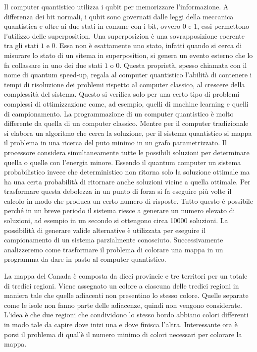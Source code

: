 Il computer quantistico utilizza i qubit per memorizzare l'informazione. A differenza dei bit normali, i qubit sono governati dalle leggi della meccanica quantistica e oltre ai due stati in comune con i bit, ovvero $0$ e $1$, essi permettono l'utilizzo delle superposition. Una superposizion è una sovrapposizione coerente tra gli stati $1$ e $0$. Essa non è esattamente uno stato, infatti quando si cerca di misurare lo stato di un sitema in superposition, si genera un evento esterno che lo fa collassare in uno dei due stati $1$ o $0$. Questa proprietà, spesso chiamata con il nome di quantum speed-up, regala al computer quantistico l'abilità di contenere i tempi di risoluzione dei problemi rispetto al computer classico, al crescere della complessità del sistema. Questo si verifica solo per una certo tipo di problemi complessi di ottimizzazione come, ad esempio, quelli di machine learning e quelli di campionamento. La programmazione di un computer quantistico è molto differente da quella di un computer classico. Mentre per il computer tradizionale si elabora un algoritmo che cerca la soluzione, per il sistema quantistico si mappa il problema in una ricerca del puto minimo in un grafo parametrizzato. Il processore considera simultaneamente tutte le possibili soluzioni per determinare quella o quelle con l'energia minore. Essendo il quantum computer un sistema probabilistico invece che deterministico non ritorna solo la soluzione ottimale ma ha una certa probabilità di ritornare anche soluzioni vicine a quella ottimale. Per trasformare questa debolezza in un punto di forza si fa eseguire più volte il calcolo in modo che produca un certo numero di risposte. Tutto questo è possibile perché in un breve periodo il sistema riesce a generare un numero elevato di soluzioni, ad esempio in un secondo si ottengono circa 10000 soluzioni. La possibilità di generare valide alternative è utilizzata per eseguire il campionamento di un sistema parzialmente conosciuto. Successivamente analizzeremo come trasformare il problema di colorare una mappa in un programma da dare in pasto al computer quantistico.

La mappa del Canada è composta da dieci provincie e tre territori per un totale di tredici regioni. Viene assegnato un colore a ciascuna delle tredici regioni in maniera tale che quelle adiacenti non presentino lo stesso colore. Quelle separate come le isole non fanno parte delle adiacenze, quindi non vengono considerate. L'idea è che due regioni che condividono lo stesso bordo abbiano colori differenti in modo tale da capire dove inizi una e dove finisca l'altra. Interessante ora è porsi il problema di qual'è il numero minimo di colori necessari per colorare la mappa.

